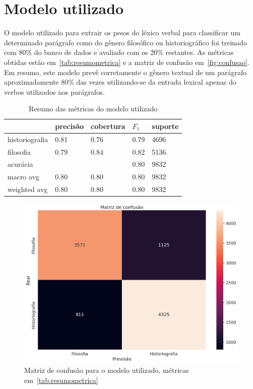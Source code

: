 \documentclass[a4paper,article,12pt,oneside]{memoir}
\begin{document}
\section{Modelo utilizado}

O modelo utilizado para extrair os pesos do léxico verbal para classificar um determinado parágrafo como do gênero filosófico ou historiográfico foi treinado com 80\% do banco de dados e avaliado com os 20\% restantes.
As métricas obtidas estão em~\autoref{tab:resumometrica} e a matriz de confusão em~\autoref{fig:confusao}.
Em resumo, este modelo prevê corretamente o gênero textual de um parágrafo aproximadamente 80\% das vezes utilizando-se da entrada lexical apenas do verbos utilizados nos parágrafos.

\begin{table}[!ht]
	\centering
	\begin{tabular}{lllll}
		\toprule
		{}             & precisão & cobertura & $F_1$ & suporte \\
		\midrule
		historiografia & 0.81     & 0.76      & 0.79  & 4696    \\
		filosofia      & 0.79     & 0.84      & 0.82  & 5136    \\
		\midrule
		acurácia       &          &           & 0.80  & 9832    \\
		macro avg      & 0.80     & 0.80      & 0.80  & 9832    \\
		weighted avg   & 0.80     & 0.80      & 0.80  & 9832    \\
		\bottomrule
	\end{tabular}
	\caption{Resumo das métricas do modelo utilizado}\label{tab:resumometrica}
\end{table}

\begin{figure}[!ht]
	\begin{center}
		\includegraphics[width=.7\linewidth]{./figs/confusao.png}
	\end{center}
	\caption{Matriz de confusão para o modelo utilizado, métricas em~\autoref{tab:resumometrica}}\label{fig:confusao}
\end{figure}
\end{document}
